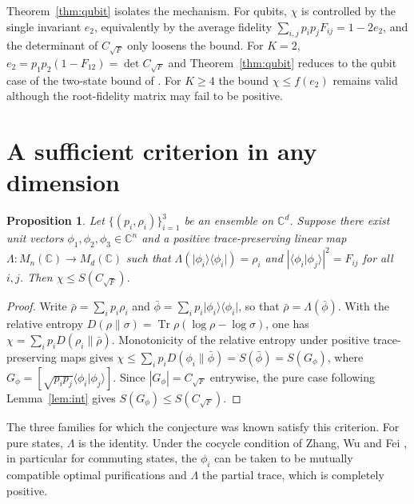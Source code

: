 \documentclass[11pt,a4paper]{article}
\newtheorem{proposition}[theorem]{Proposition}
\theoremstyle{definition}
\theoremstyle{plain}
\DeclareMathOperator{\Tr}{Tr}
\newcommand{\ket}[1]{\lvert#1\rangle}
\newcommand{\bra}[1]{\langle#1\rvert}
\newcommand{\braket}[2]{\langle#1\vert#2\rangle}
\newcommand{\C}{\mathbb{C}}
\newcommand{\CF}{C_{\sqrt F}}
\begin{document}
Theorem~\ref{thm:qubit} isolates the mechanism. For qubits, $\chi$ is
controlled by the single invariant $e_2$, equivalently by the average fidelity
$\sum_{i,j}p_ip_jF_{ij}=1-2e_2$, and the determinant of $\CF$ only loosens the
bound. For $K=2$, $e_2=p_1p_2(1-F_{12})=\det\CF$ and Theorem~\ref{thm:qubit}
reduces to the qubit case of the two-state bound of \cite{RFZ2010}. For
$K\ge4$ the bound $\chi\le f(e_2)$ remains valid although the root-fidelity
matrix may fail to be positive.

\section{A sufficient criterion in any dimension}
\begin{proposition}\label{prop:crit}
Let $\{(p_i,\rho_i)\}_{i=1}^3$ be an ensemble on $\C^d$. Suppose there exist
unit vectors $\phi_1,\phi_2,\phi_3\in\C^n$ and a positive trace-preserving
linear map $\Lambda:M_n(\C)\to M_d(\C)$ such that
$\Lambda(\ket{\phi_i}\bra{\phi_i})=\rho_i$ and
$|\braket{\phi_i}{\phi_j}|^2=F_{ij}$ for all $i,j$. Then
$\chi\le S(\CF)$.
\end{proposition}

\begin{proof}
Write $\bar\rho=\sum_ip_i\rho_i$ and
$\bar\phi=\sum_ip_i\ket{\phi_i}\bra{\phi_i}$, so that $\bar\rho=\Lambda(\bar\phi)$.
With the relative entropy $D(\rho\|\sigma)=\Tr\rho(\log\rho-\log\sigma)$, one
has $\chi=\sum_ip_iD(\rho_i\|\bar\rho)$. Monotonicity of the relative entropy
under positive trace-preserving maps \cite{MHR2017} gives
$\chi\le\sum_ip_iD(\phi_i\|\bar\phi)=S(\bar\phi)=S(G_\phi)$, where
$G_\phi=[\sqrt{p_ip_j}\braket{\phi_i}{\phi_j}]$. Since $|G_\phi|=\CF$
entrywise, the pure case following Lemma~\ref{lem:int} gives
$S(G_\phi)\le S(\CF)$.
\end{proof}

The three families for which the conjecture was known satisfy this criterion.
For pure states, $\Lambda$ is the identity. Under the cocycle condition of
Zhang, Wu and Fei \cite{ZWF2012}, in particular for commuting states, the
$\phi_i$ can be taken to be mutually compatible optimal purifications and
$\Lambda$ the partial trace, which is completely positive.
\end{document}
